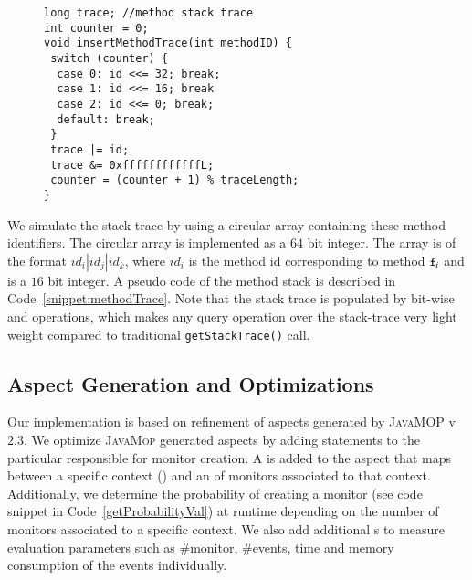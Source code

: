  \begin{figure}[t]
\begin{lstlisting}
long trace; //method stack trace
int counter = 0;
void insertMethodTrace(int methodID) {
 switch (counter) {
  case 0: id <<= 32; break;
  case 1: id <<= 16; break
  case 2: id <<= 0; break;
  default: break;
 }
 trace |= id;
 trace &= 0xffffffffffffL;
 counter = (counter + 1) % traceLength;
}
\end{lstlisting}
\end{figure}

We simulate the stack trace by using a circular array containing these method 
identifiers. The circular array is implemented as a $64$ bit  
integer. The array is of the format $id_i|id_j|id_k$, where $id_i$ is the 
method id corresponding to method $\code{f}_i$ and is a $16$ bit integer. A 
pseudo code of the method stack is described in Code~\ref{snippet:methodTrace}. 
Note that the stack trace is populated by bit-wise \code{<<} and \code{|} 
operations, which makes any query operation over the stack-trace very light 
weight compared to traditional \texttt{getStackTrace()} call.

\subsection{Aspect Generation and Optimizations}
\label{subsec:aspectGen}

Our implementation is based on refinement of aspects generated by 
\textsc{JavaMOP} v$2.3$. 
% 
% 
We optimize \textsc{JavaMop} generated aspects by adding statements to the 
particular  responsible for monitor creation. A  
 is added to the aspect that maps between a specific context () and 
an  of monitors associated to that context. Additionally, we 
 determine the probability of creating a monitor (see code snippet in
 Code~\ref{getProbabilityVal}) at runtime depending on the number of  monitors
 associated to a specific context. 
 We also add additional s to measure evaluation parameters such 
 as \#monitor, \#events, time and memory consumption of the events individually.

